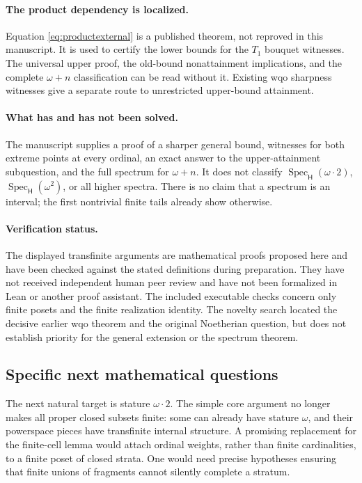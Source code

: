 \documentclass[11pt,a4paper]{article}
\theoremstyle{definition}
\newcommand{\HH}{\mathsf H}
\newcommand{\Spec}{\operatorname{Spec}_{\HH}}
\numberwithin{equation}{section}
\begin{document}
\paragraph{The product dependency is localized.}
Equation \eqref{eq:productexternal} is a published theorem, not reproved
in this manuscript.  It is used to certify the lower bounds for the
$T_1$ bouquet witnesses.  The universal upper proof, the old-bound
nonattainment implications, and the complete $\omega+n$ classification
can be read without it.  Existing wqo sharpness witnesses give a
separate route to unrestricted upper-bound attainment.

\paragraph{What has and has not been solved.}
The manuscript supplies a proof of a sharper general bound, witnesses
for both extreme points at every ordinal, an exact answer to the
upper-attainment subquestion, and the full spectrum for $\omega+n$.
It does not classify $\Spec(\omega\cdot2)$, $\Spec(\omega^2)$, or all
higher spectra.  There is no claim that a spectrum is an interval;
the first nontrivial finite tails already show otherwise.

\paragraph{Verification status.}
The displayed transfinite arguments are mathematical proofs proposed
here and have been checked against the stated definitions during
preparation.  They have not received independent human peer review
and have not been formalized in Lean or another proof assistant.  The
included executable checks concern only finite posets and the finite
realization identity.  The novelty search located the decisive earlier
wqo theorem and the original Noetherian question, but does not establish
priority for the general extension or the spectrum theorem.

\subsection{Specific next mathematical questions}

The next natural target is stature $\omega\cdot2$.  The simple core
argument no longer makes all proper closed subsets finite: some can
already have stature $\omega$, and their powerspace pieces have
transfinite internal structure.  A promising replacement for the
finite-cell lemma would attach ordinal weights, rather than finite
cardinalities, to a finite poset of closed strata.  One would need
precise hypotheses ensuring that finite unions of fragments cannot
silently complete a stratum.
\end{document}
